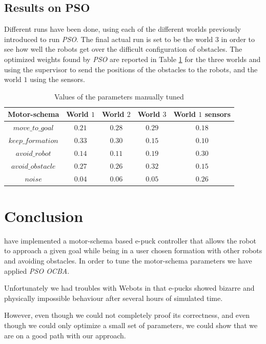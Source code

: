 \documentclass[journal]{IEEEtran}
\begin{document}
\subsection{Results on PSO}
Different runs have been done, using each of the different worlds 
previously introduced to run \textit{PSO}. The final actual run is set to 
be the world $3$ in order to see how well the robots get over the difficult 
configuration of obstacles. The optimized weights found by \textit{PSO} are 
reported in Table \ref{weights} for the three worlds and using the 
supervisor to send the positions of the obstacles to the robots, and the 
world $1$ using the sensors. 
\begin{table}
\begin{center}
\begin{tabular}{|c|c|c|c|c|}
  \hline
  Motor-schema & World $1$ & World $2$ & World $3$ & World $1$ sensors \\
  \hline
  $move\_to\_goal$ &  $0.21$ & $0.28$ & $0.29$ & $0.18$\\
  $keep\_formation$ & $0.33$ & $0.30$ & $0.15$ & $0.10$\\
  $avoid\_robot$ & $0.14$ & $0.11$ & $0.19$ & $0.30$\\
  $avoid\_obstacle$ & $0.27$ & $0.26$ & $0.32$ & $0.15$\\
  $noise$ & $0.04$ & $0.06$ & $0.05$ & $0.26$\\
  \hline
\end{tabular}
\caption{Values of the parameters manually tuned} \label{weights}
\end{center} 
\end{table}


\section{Conclusion}

 have implemented a motor-schema based e-puck controller 
that allows the robot to approach a given goal while being in a user chosen 
formation with other robots and avoiding obstacles. In order to tune the 
motor-schema parameters we have applied \textit{PSO OCBA}. 

Unfortunately we had troubles with Webots\textregistered{} in that e-pucks 
showed bizarre and physically impossible behaviour after several hours of 
simulated time.

However, even though we could not completely proof its correctness, and even though we could only optimize a small set of parameters, we 
could show that we are on a good path with our approach.
\end{document}
